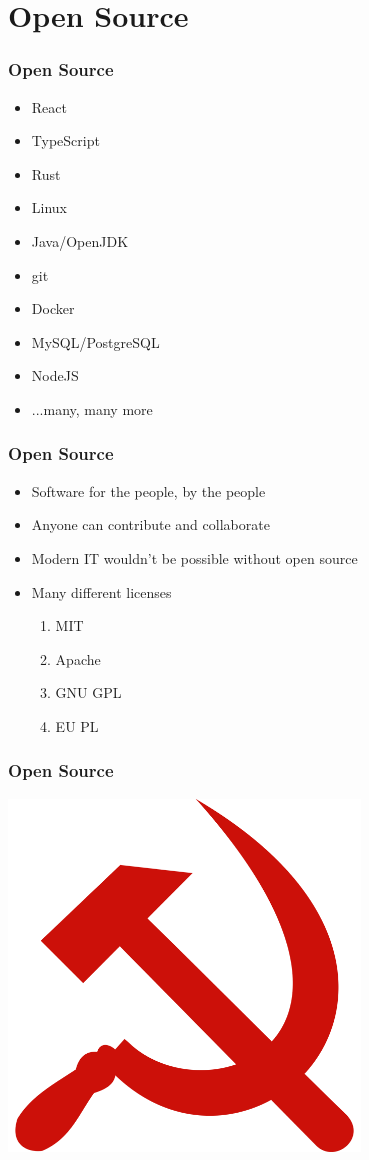 \documentclass[presentation]{beamer}
\begin{document}
  \section{Open Source}
  \begin{frame}
    \frametitle{Open Source}
    \begin{itemize}
      \item React
      \item TypeScript
      \item Rust
      \item Linux
      \item Java/OpenJDK
      \item git
      \item Docker
      \item MySQL/PostgreSQL
      \item NodeJS
      \item ...many, many more
    \end{itemize}
  \end{frame}
  \begin{frame}
    \frametitle{Open Source}
 
    \begin{itemize}
      \item Software for the people, by the people
      \item Anyone can contribute and collaborate
      \item Modern IT wouldn't be possible without open source
      \item Many different licenses
      \begin{enumerate}
        \item MIT
        \item Apache
        \item GNU GPL
        \item EU PL
      \end{enumerate}
    \end{itemize}
  \end{frame}

  \begin{frame}
    \frametitle{Open Source}
 
    \centering
    \includegraphics[width=0.7\textwidth]{hammer.png}
  \end{frame}
\end{document}

